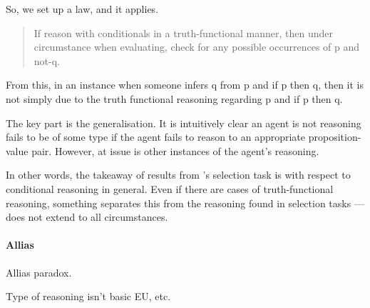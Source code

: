 \begin{note}
  So, we set up a law, and it applies.

  \begin{quote}
    If reason with conditionals in a truth-functional manner, then under circumstance when evaluating, check for any possible occurrences of p and not-q.
  \end{quote}

  From this, in an instance when someone infers q from p and if p then q, then it is not simply due to the truth functional reasoning regarding p and if p then q.

  The key part is the generalisation.
  It is intuitively clear an agent is not reasoning fails to be of some type if the agent fails to reason to an appropriate proposition-value pair.
  However, at issue is other instances of the agent's reasoning.

  In other words, the takeaway of results from \citeauthor{Wason:1966aa}'s selection task is with respect to conditional reasoning in general.
  Even if there are cases of truth-functional reasoning, something separates this from the reasoning found in selection tasks --- does not extend to all circumstances.
\end{note}

\paragraph{Allias}

\begin{note}
  Allias paradox.

  Type of reasoning isn't basic EU, etc.
\end{note}

